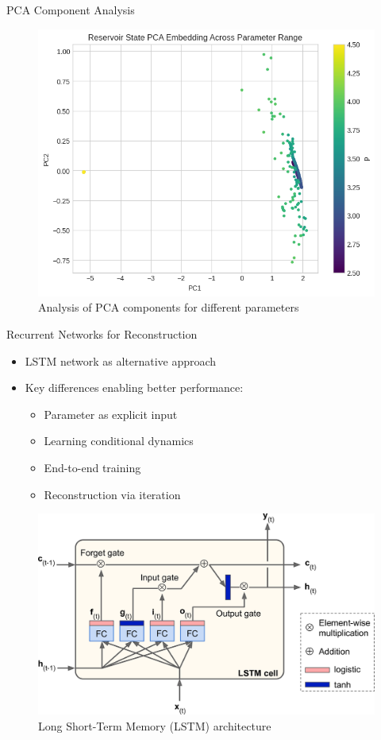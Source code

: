 \documentclass{beamer}
\begin{document}
\begin{frame}{PCA Component Analysis}
\begin{figure}
\centering
\includegraphics[width=0.8\linewidth]{figures/bd_elm_pca_analysis.png}
\caption{Analysis of PCA components for different parameters}
\end{figure}
\end{frame}

\begin{frame}{Recurrent Networks for Reconstruction}
\begin{itemize}
\item LSTM network as alternative approach
\item Key differences enabling better performance:
    \begin{itemize}
    \item Parameter as explicit input
    \item Learning conditional dynamics
    \item End-to-end training
    \item Reconstruction via iteration
    \end{itemize}
\end{itemize}
\begin{figure}
\centering
\includegraphics[width=0.8\linewidth]{figures/LSTM_arch.png}
\caption{Long Short-Term Memory (LSTM) architecture}
\end{figure}
\end{frame}
\end{document}
